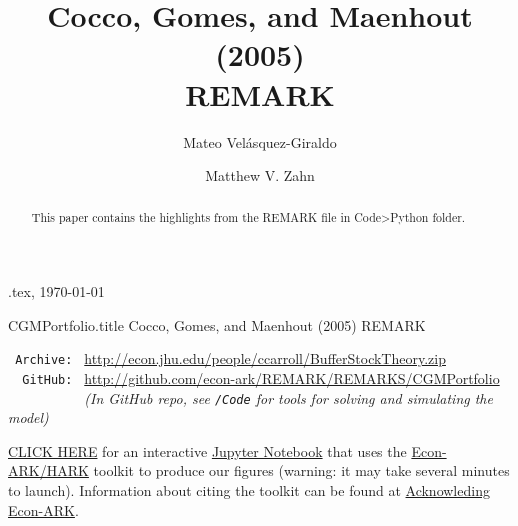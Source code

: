 \documentclass[./CGMPortfolio.tex]{subfiles}
\begin{document}
\hfill{\tiny \texname.tex, \today}

\begin{verbatimwrite}{CGMPortfolio.title}  %
Cocco, Gomes, and Maenhout (2005) REMARK
\end{verbatimwrite}

\title{Cocco, Gomes, and Maenhout (2005) \\ REMARK}

\author{Mateo Vel\'asquez-Giraldo \and Matthew V. Zahn}



\maketitle 

\hypertarget{abstract}{}
\begin{abstract}
This paper contains the highlights from the REMARK file in Code>Python folder.
\end{abstract}

\hypertarget{links}{}
\begin{small}
\parbox{\textwidth}{
\begin{center}
\begin{tabbing}
\texttt{~Archive:~} \= \= \url{http://econ.jhu.edu/people/ccarroll/BufferStockTheory.zip} \kill \\  %
\texttt{~~GitHub:~} \> \> 
\url{http://github.com/econ-ark/REMARK/REMARKS/CGMPortfolio} \\
\texttt{~~~~~~~~~~} \> \> \textit{(In GitHub repo, see \texttt{/Code} for tools for solving and simulating the model)} \\
\end{tabbing}
\end{center}
          
\href{https://mybinder.org/v2/gh/matthew-zahn/CGMPort/develop?filepath=REMARK\%2FCGM_REMARK.ipynb}{CLICK HERE} for an interactive \href{https://en.wikipedia.org/wiki/Project\_Jupyter\#Jupyter_Notebook}{Jupyter Notebook} that uses the \href{https://econ-ark/HARK}{Econ-ARK/HARK} toolkit to produce our figures (warning: it may take several minutes to launch).  Information about citing the toolkit can be found at \href{https://econ-ark.org/acknowledging/}{Acknowleding Econ-ARK}.
} %
\end{small}

\begin{authorsinfo}
\end{authorsinfo}
\end{document}
